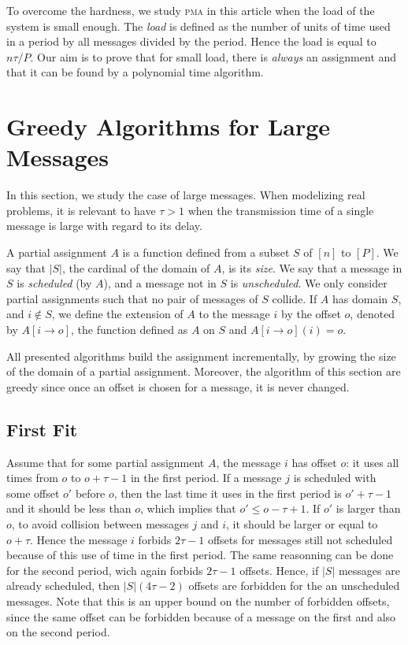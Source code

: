 \documentclass[10pt, conference, letterpaper]{IEEEtran}
\newcommand\pma{\textsc{pma}\xspace}
\begin{document}
To overcome the hardness, we study \pma in this article when the load of the system is small enough. The \emph{load} is defined as the number of units of time used in a period by all messages divided by the period. Hence the load is equal to $n\tau /P$.
Our aim is to prove that for small load, there is \emph{always} an assignment and that it can be found by a polynomial time algorithm.


\section{Greedy Algorithms for Large Messages}

In this section, we study the case of large messages. When modelizing real problems,
it is relevant to have $\tau > 1$ when the transmission time of a single message is large with regard to its delay.


A partial assignment $A$ is a function defined from a subset $S$ of $[n]$ to $[P]$.
We say that $|S|$, the cardinal of the domain of $A$, is its \emph{size}.
We say that a message in $S$ is \emph{scheduled} (by $A$), and a message not in $S$ is \emph{unscheduled}. We only consider partial assignments such that no pair of messages of $S$ collide. If $A$ has domain $S$, and $i \notin S$, we define the extension of $A$ to the message $i$ by the offset $o$, denoted by $A[i \rightarrow o]$, the function defined as $A$ on $S$ and $A[i \rightarrow o](i) = o$.

All presented algorithms build the assignment incrementally, by growing the size of the domain of a partial assignment. Moreover, the algorithm of this section are greedy since once an offset is chosen for a message, it is never changed.


\subsection{First Fit}


Assume that for some partial assignment $A$, the message $i$ has offset $o$: it uses all times from $o$ to $o + \tau -1$ in the first period. If a message $j$ is scheduled with some offset $o'$ before $o$, then the last time it uses in the first period is $o'+\tau-1$ and it should be less than $o$, which implies that $o' \leq o - \tau + 1$. If $o'$ is larger than $o$, to avoid collision between messages $j$ and $i$, it should be larger or equal to $o+ \tau$. Hence the message $i$ forbids $2\tau -1$ offsets for messages still not scheduled because of this use of time in the first period. The same reasonning can be done for the second period, wich again forbids $2\tau -1$ offsets. Hence, if $|S|$ messages are already scheduled, then $|S|(4\tau -2)$ offsets are forbidden for the an unscheduled messages. Note that this is an upper bound on the number of forbidden offsets, since the same offset can be forbidden because of a message on the first and also on the second period.
\end{document}
